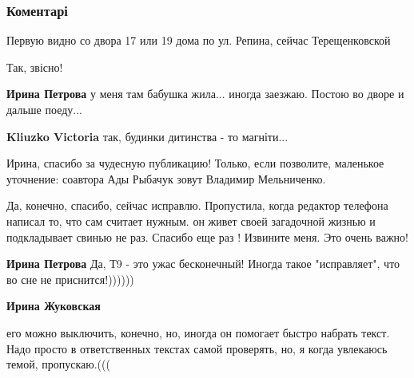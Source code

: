  
 
 
 
 
\subsubsection{Коментарі}
\label{sec:30_04_2020.fb.fb_group.story_kiev_ua.1.mozaika_kiev.cmt}

\begin{itemize} %
Первую видно со двора 17 или 19 дома по ул. Репина, сейчас Терещенковской

\begin{itemize} %
Так, звісно!

\textbf{Ирина Петрова} у меня там бабушка жила... иногда заезжаю. Постою во дворе и дальше поеду...

\textbf{Kliuzko Victoria} так, будинки дитинства - то магніти...
\end{itemize} %


Ирина, спасибо за чудесную публикацию! Только, если позволите, маленькое
уточнение: соавтора Ады Рыбачук зовут Владимир Мельниченко.

\begin{itemize} %

Да, конечно, спасибо, сейчас исправлю. Пропустила, когда редактор телефона
написал то, что сам считает нужным. он живет своей загадочной жизнью и
подкладывает свинью не раз. Спасибо еще раз ! Извините меня. Это очень важно!

\textbf{Ирина Петрова} Да, Т9 - это ужас бесконечный! Иногда такое "исправляет", что во сне не приснится!))))))

\textbf{Ирина Жуковская} 

его можно выключить, конечно, но, иногда он помогает быстро набрать текст. Надо
просто в ответственных текстах самой проверять, но, я когда увлекаюсь темой,
пропускаю.(((

\end{itemize} %


\end{itemize}
